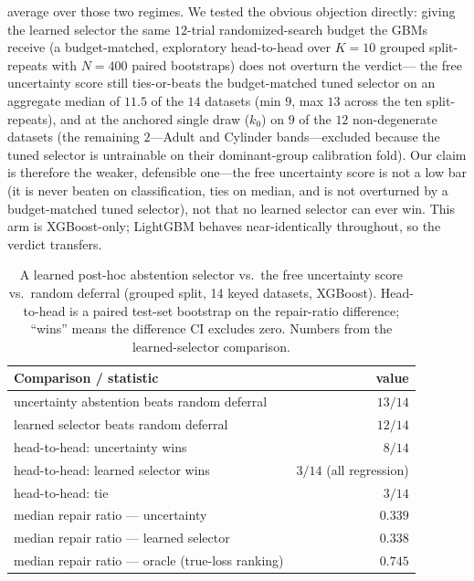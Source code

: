 \documentclass[pdflatex,sn-mathphys-num]{sn-jnl}
\begin{document}
average over those two regimes. We tested the obvious objection directly: giving the learned selector the
same $12$-trial randomized-search budget the GBMs receive (a budget-matched, exploratory head-to-head
over $K{=}10$ grouped split-repeats with $N{=}400$ paired bootstraps) does not overturn the verdict---
the free uncertainty score still ties-or-beats the budget-matched tuned selector on an aggregate median of
$11.5$ of the $14$ datasets (min $9$, max $13$ across the ten split-repeats), and at the anchored single draw
($k_0$) on $9$ of the $12$ non-degenerate datasets (the remaining $2$---Adult and
Cylinder bands---excluded because the tuned selector is untrainable on their dominant-group
calibration fold). Our claim is therefore the weaker, defensible one---the free uncertainty score is not
a low bar (it is never beaten on classification, ties on median, and is not overturned by a budget-matched
tuned selector), not that no learned selector can ever win. This arm is
XGBoost-only; LightGBM behaves near-identically throughout, so the verdict transfers.

\begin{table}[htbp]\centering\small
\caption{A learned post-hoc abstention selector vs.\ the free uncertainty score vs.\ random deferral (grouped
split, 14 keyed datasets, XGBoost). Head-to-head is a paired test-set bootstrap on the repair-ratio difference;
``wins'' means the difference CI excludes zero. Numbers from the learned-selector comparison.}\label{tab:learned}
\begin{tabular}{lr}
\toprule
Comparison / statistic & value \\
\midrule
uncertainty abstention beats random deferral      & $13/14$ \\
learned selector beats random deferral            & $12/14$ \\
head-to-head: uncertainty wins                     & $8/14$ \\
head-to-head: learned selector wins                & $3/14$ (all regression) \\
head-to-head: tie                                  & $3/14$ \\
median repair ratio --- uncertainty                & $0.339$ \\
median repair ratio --- learned selector           & $0.338$ \\
median repair ratio --- oracle (true-loss ranking) & $0.745$ \\
\bottomrule
\end{tabular}
\end{table}
\end{document}
